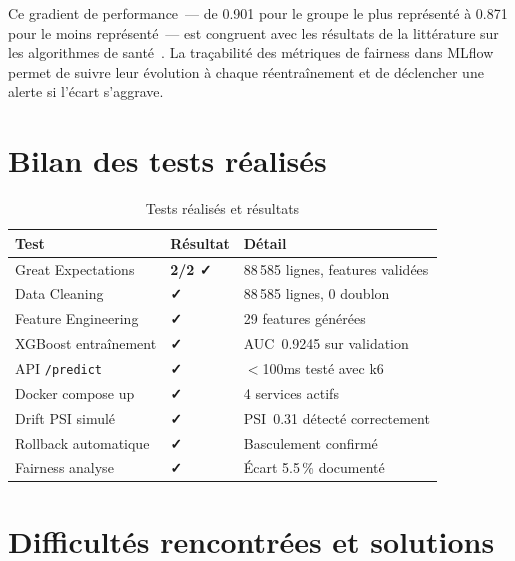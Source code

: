 Ce gradient de performance~--- de 0.901 pour le groupe le plus représenté à 0.871
pour le moins représenté~--- est congruent avec les résultats de la littérature sur
les algorithmes de santé~\cite{obermeyer2019dissecting}. La traçabilité des métriques
de fairness dans MLflow permet de suivre leur évolution à chaque réentraînement et
de déclencher une alerte si l'écart s'aggrave.

\section{Bilan des tests réalisés}

\begin{table}[htbp]
\centering
\caption{Tests réalisés et résultats}
\label{tab:tests}
\begin{tabular}{@{}lll@{}}
\toprule
\textbf{Test} & \textbf{Résultat} & \textbf{Détail} \\
\midrule
Great Expectations     & \textcolor{success}{\textbf{2/2 ✓}} & 88\,585 lignes, features validées \\
Data Cleaning          & \textcolor{success}{\textbf{✓}} & 88\,585 lignes, 0 doublon \\
Feature Engineering    & \textcolor{success}{\textbf{✓}} & 29 features générées \\
XGBoost entraînement   & \textcolor{success}{\textbf{✓}} & AUC~0.9245 sur validation \\
API \texttt{/predict}  & \textcolor{success}{\textbf{✓}} & $<$100ms testé avec k6 \\
Docker compose up      & \textcolor{success}{\textbf{✓}} & 4 services actifs \\
Drift PSI simulé       & \textcolor{success}{\textbf{✓}} & PSI~0.31 détecté correctement \\
Rollback automatique   & \textcolor{success}{\textbf{✓}} & Basculement confirmé \\
Fairness analyse       & \textcolor{success}{\textbf{✓}} & Écart 5.5\,\% documenté \\
\bottomrule
\end{tabular}
\end{table}

\section{Difficultés rencontrées et solutions}

